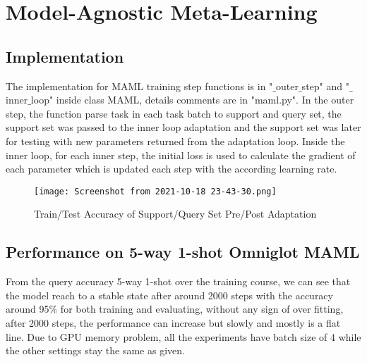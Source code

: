 \documentclass[]{article}
\begin{document}
	\section{Model-Agnostic Meta-Learning}
	\subsection{Implementation}
	The implementation for MAML training step functions is in "$\_$outer$\_$step" and "$\_$inner$\_$loop" inside class MAML, details comments are in "maml.py". In the outer step, the function parse task in each task batch to support and query set, the support set was passed to the inner loop adaptation and the support set was later for testing with new parameters returned from the adaptation loop. Inside the inner loop, for each inner step, the initial loss is used to calculate the gradient of each parameter which is updated each step with the according learning rate.
	
	\begin{center} 
		\begin{figure}[H]
			\centering
			\texttt{[image: Screenshot from 2021-10-18 23-43-30.png]}
			\caption{Train/Test Accuracy of Support/Query Set Pre/Post Adaptation}
		\end{figure}	
	\end{center}
	
	\subsection{Performance on 5-way 1-shot Omniglot MAML}
	From the query accuracy 5-way 1-shot over the training course, we can see that the model reach to a stable state after around 2000 steps with the accuracy around 95$\%$ for both training and evaluating, without any sign of over fitting, after 2000 steps, the performance can increase but slowly and mostly is a flat line. Due to GPU memory problem, all the experiments have batch size of 4 while the other settings stay the same as given.
	
	
\end{document}
